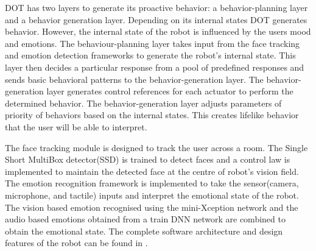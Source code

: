 \documentclass[letterpaper, 10 pt, conference]{ieeeconf}  %
\begin{document}
DOT has two layers to generate its proactive behavior: a behavior-planning layer and a behavior generation layer. Depending on its internal states DOT generates behavior. However, the internal state of the robot is influenced by the users mood and emotions. The behaviour-planning layer takes input from the face tracking and emotion detection frameworks to generate the robot's internal state. This layer then decides a particular response from a pool of predefined responses and sends basic behavioral patterns to the behavior-generation layer. The behavior-generation layer generates control references for each actuator to perform the determined behavior. The behavior-generation layer adjusts parameters of priority of behaviors based on the internal states. This creates lifelike behavior that the user will be able to interpret.






The face tracking module is designed to track the user across a room. The Single Short MultiBox detector(SSD) is trained to detect faces and a control law is implemented to maintain the detected face at the centre of robot's vision field. The emotion recognition framework is implemented to take the sensor(camera, microphone, and tactile) inputs and interpret the emotional state of the robot. The vision based emotion recognised using the mini-Xception network and the audio based emotions obtained from a train DNN network are combined to obtain the emotional state. The complete software architecture and design features of the robot can be found in \cite{r4}. 

\end{document}
